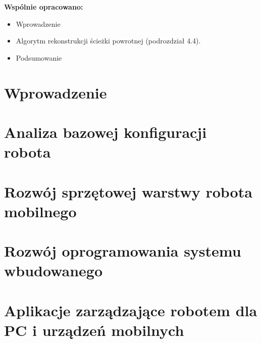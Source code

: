 \documentclass[a4paper,12pt, oneside]{mwbk}
\begin{document}
\textbf{Wspólnie opracowano:}
\begin{itemize}
  \item Wprowadzenie
  \item Algorytm rekonstrukcji ścieżki powrotnej (podrozdział 4.4).
  \item Podsumowanie
\end{itemize}


\newpage
\tableofcontents

\newpage 
\chapter*{Wprowadzenie}



\newpage
\chapter{Analiza bazowej konfiguracji robota}



\newpage
\chapter{Rozwój sprzętowej warstwy robota mobilnego}









\newpage
\chapter{Rozwój oprogramowania systemu wbudowanego}








\newpage
\chapter{Aplikacje zarządzające robotem dla PC i urządzeń mobilnych}




\end{document}
